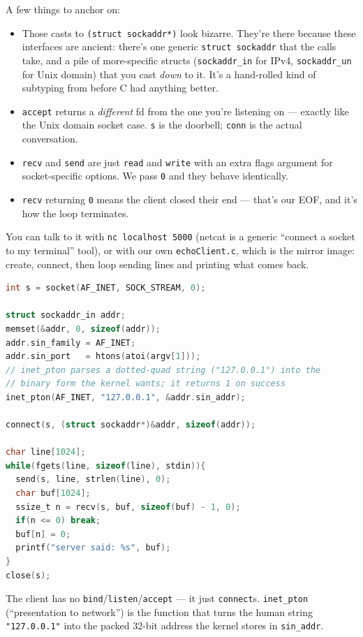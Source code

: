 \documentclass[11pt]{article}
\begin{document}
A few things to anchor on:
\begin{itemize}
  \item Those casts to \texttt{(struct sockaddr*)} look bizarre.
    They're there because these interfaces are ancient: there's one
    generic \texttt{struct sockaddr} that the calls take, and a pile
    of more-specific structs (\texttt{sockaddr\_in} for IPv4,
    \texttt{sockaddr\_un} for Unix domain) that you cast \emph{down}
    to it. It's a hand-rolled kind of subtyping from before C had
    anything better.
  \item \texttt{accept} returns a \emph{different} fd from the one
    you're listening on --- exactly like the Unix domain socket case.
    \texttt{s} is the doorbell; \texttt{conn} is the actual
    conversation.
  \item \texttt{recv} and \texttt{send} are just \texttt{read} and
    \texttt{write} with an extra flags argument for socket-specific
    options. We pass \texttt{0} and they behave identically.
  \item \texttt{recv} returning \texttt{0} means the client closed
    their end --- that's our EOF, and it's how the loop terminates.
\end{itemize}

You can talk to it with \texttt{nc localhost 5000} (netcat is a
generic ``connect a socket to my terminal'' tool), or with our own
\texttt{echoClient.c}, which is the mirror image: create, connect,
then loop sending lines and printing what comes back.

\begin{lstlisting}[language=C]
int s = socket(AF_INET, SOCK_STREAM, 0);

struct sockaddr_in addr;
memset(&addr, 0, sizeof(addr));
addr.sin_family = AF_INET;
addr.sin_port   = htons(atoi(argv[1]));
// inet_pton parses a dotted-quad string ("127.0.0.1") into the
// binary form the kernel wants; it returns 1 on success
inet_pton(AF_INET, "127.0.0.1", &addr.sin_addr);

connect(s, (struct sockaddr*)&addr, sizeof(addr));

char line[1024];
while(fgets(line, sizeof(line), stdin)){
  send(s, line, strlen(line), 0);
  char buf[1024];
  ssize_t n = recv(s, buf, sizeof(buf) - 1, 0);
  if(n <= 0) break;
  buf[n] = 0;
  printf("server said: %s", buf);
}
close(s);
\end{lstlisting}

The client has no \texttt{bind}/\texttt{listen}/\texttt{accept} ---
it just \texttt{connect}s. \texttt{inet\_pton} (``presentation to
network'') is the function that turns the human string
\texttt{"127.0.0.1"} into the packed 32-bit address the kernel
stores in \texttt{sin\_addr}.
\end{document}
